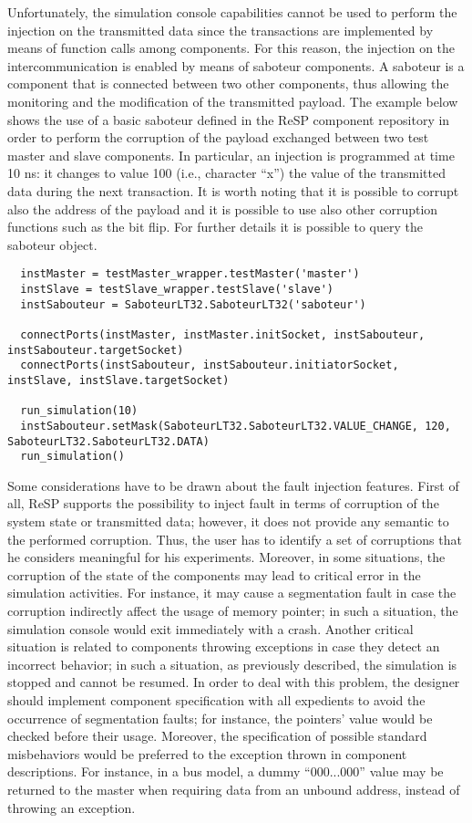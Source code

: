 \indent Unfortunately, the simulation console capabilities cannot be used to perform the injection on the transmitted data since the transactions are implemented by means of function calls among components. For this reason, the injection on the intercommunication is enabled by means of saboteur components. A saboteur is a component that is connected between two other components, thus allowing the monitoring and the modification of the transmitted payload. The example below shows the use of a basic saboteur defined in the ReSP component repository in order to perform the corruption of the payload exchanged between two test master and slave components. In particular, an injection is programmed at time 10 ns: it changes to value 100 (i.e., character ``x'') the value of the transmitted data during the next transaction. It is worth noting that it is possible to corrupt also the address of the payload and it is possible to use also other corruption functions such as the bit flip. For further details it is possible to query the saboteur object.

\scriptsize
\begin{verbatim}
  instMaster = testMaster_wrapper.testMaster('master')
  instSlave = testSlave_wrapper.testSlave('slave')
  instSabouteur = SaboteurLT32.SaboteurLT32('saboteur')
  
  connectPorts(instMaster, instMaster.initSocket, instSabouteur, instSabouteur.targetSocket)
  connectPorts(instSabouteur, instSabouteur.initiatorSocket, instSlave, instSlave.targetSocket)
  
  run_simulation(10)
  instSabouteur.setMask(SaboteurLT32.SaboteurLT32.VALUE_CHANGE, 120, SaboteurLT32.SaboteurLT32.DATA)
  run_simulation()
\end{verbatim}
\normalsize

\indent Some considerations have to be drawn about the fault injection features. First of all, ReSP supports the possibility to inject fault in terms of corruption of the system state or transmitted data; however, it does not provide any semantic to the performed corruption. Thus, the user has to identify a set of corruptions that he considers meaningful for his experiments. Moreover, in some situations, the corruption of the state of the components may lead to critical error in the simulation activities. For instance, it may cause a segmentation fault in case the corruption indirectly affect the usage of memory pointer; in such a situation, the simulation console would exit immediately with a crash. Another critical situation is related to components throwing exceptions in case they detect an incorrect behavior; in such a situation, as previously described, the simulation is stopped and cannot be resumed. In order to deal with this problem, the designer should implement component specification with all expedients to avoid the occurrence of segmentation faults; for instance, the pointers' value would be checked before their usage. Moreover, the specification of possible standard misbehaviors would be preferred to the exception thrown in component descriptions. For instance, in a bus model, a dummy ``000...000'' value may be returned to the master when requiring data from an unbound address, instead of throwing an exception.


